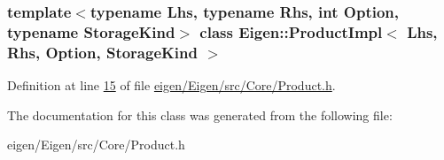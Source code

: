\subsubsection*{template$<$typename Lhs, typename Rhs, int Option, typename Storage\+Kind$>$\newline
class Eigen\+::\+Product\+Impl$<$ Lhs, Rhs, Option, Storage\+Kind $>$}



Definition at line \hyperlink{eigen_2_eigen_2src_2_core_2_product_8h_source_l00015}{15} of file \hyperlink{eigen_2_eigen_2src_2_core_2_product_8h_source}{eigen/\+Eigen/src/\+Core/\+Product.\+h}.



The documentation for this class was generated from the following file\+:\begin{DoxyCompactItemize}
\item 
eigen/\+Eigen/src/\+Core/\+Product.\+h\end{DoxyCompactItemize}
